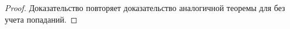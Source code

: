 \theoremtext{\ref{FIFO_equation}}{\DiapazonFIFO}
\begin{proof}
    Доказательство повторяет доказательство аналогичной теоремы для \LRU без учета попаданий.
%
%
%
%
%
%

\end{proof}
